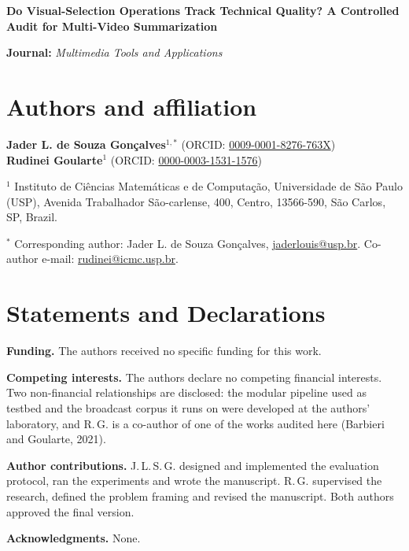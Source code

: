 \documentclass[11pt,a4paper]{article}
\begin{document}
{\Large\bfseries Do Visual-Selection Operations Track Technical Quality? A Controlled
Audit for Multi-Video Summarization\par}

\medskip
\textbf{Journal:} \emph{Multimedia Tools and Applications}

\section*{Authors and affiliation}
\textbf{Jader L. de Souza Gon\c{c}alves}$^{1,*}$ \;
(ORCID: \href{https://orcid.org/0009-0001-8276-763X}{0009-0001-8276-763X})\\
\textbf{Rudinei Goularte}$^{1}$ \;
(ORCID: \href{https://orcid.org/0000-0003-1531-1576}{0000-0003-1531-1576})

$^{1}$ Instituto de Ci\^{e}ncias Matem\'{a}ticas e de Computa\c{c}\~{a}o, Universidade de
S\~{a}o Paulo (USP), Avenida Trabalhador S\~{a}o-carlense, 400, Centro, 13566-590,
S\~{a}o Carlos, SP, Brazil.

$^{*}$ Corresponding author: Jader L. de Souza Gon\c{c}alves,
\href{mailto:jaderlouis@usp.br}{jaderlouis@usp.br}. Co-author e-mail:
\href{mailto:rudinei@icmc.usp.br}{rudinei@icmc.usp.br}.

\section*{Statements and Declarations}
\textbf{Funding.} The authors received no specific funding for this work.

\textbf{Competing interests.} The authors declare no competing financial interests. Two
non-financial relationships are disclosed: the modular pipeline used as testbed and the
broadcast corpus it runs on were developed at the authors' laboratory, and R.\,G. is a
co-author of one of the works audited here (Barbieri and Goularte, 2021).

\textbf{Author contributions.} J.\,L.\,S.\,G. designed and implemented the evaluation
protocol, ran the experiments and wrote the manuscript. R.\,G. supervised the research,
defined the problem framing and revised the manuscript. Both authors approved the final
version.

\textbf{Acknowledgments.} None.
\end{document}
